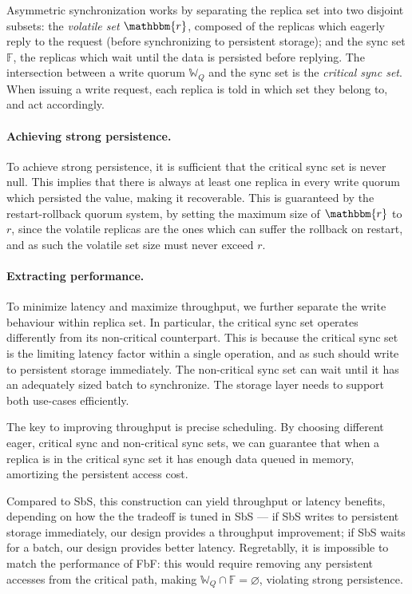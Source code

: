 Asymmetric synchronization works by separating the replica set
into two disjoint subsets: the \emph{volatile set}
$\mathbbm{r}$, composed of the replicas which eagerly reply to the
request (before synchronizing to persistent storage); and the
sync set $\mathbb{F}$, the replicas which wait until the data is
persisted before replying. The intersection between a write
quorum $\mathbb{W}_Q$ and the sync set is the \emph{critical
sync set}. When issuing a write request, each replica is told in
which set they belong to, and act accordingly.

\paragraph{Achieving strong persistence.} To achieve strong
persistence, it is sufficient that the critical sync set is
never null. This implies that there is always at least one
replica in every write quorum which persisted the value, making
it recoverable. This is guaranteed by the restart-rollback quorum
system, by setting the maximum size of $\mathbbm{r}$ to $r$,
since the volatile replicas are the ones which can suffer the rollback on
restart, and as such the volatile set size must never exceed $r$.

\paragraph{Extracting performance.} To minimize latency and
maximize throughput, we further separate the write behaviour
within replica set. In particular, the critical sync set
operates differently from its non-critical counterpart. This is
because the critical sync set is the limiting latency factor
within a single operation, and as such should write to persistent
storage immediately. The non-critical sync set can wait until it
has an adequately sized batch to synchronize. The storage layer needs
to support both use-cases efficiently.

The key to improving throughput is precise scheduling. By
choosing different eager, critical sync and non-critical sync
sets, we can guarantee that when a replica is in the critical sync set it
has enough data queued in memory, amortizing the persistent
access cost.

Compared to SbS, this construction can yield throughput or latency benefits,
depending on how the the tradeoff is tuned in SbS --- if SbS writes to
persistent storage immediately, our design provides a throughput
improvement; if SbS waits for a batch, our design provides better
latency. Regretablly, it is impossible to match the performance
of FbF\@: this would require removing any persistent accesses from
the critical path, making $\mathbb{W}_Q \cap \mathbb{F} =
\varnothing$, violating strong persistence.


